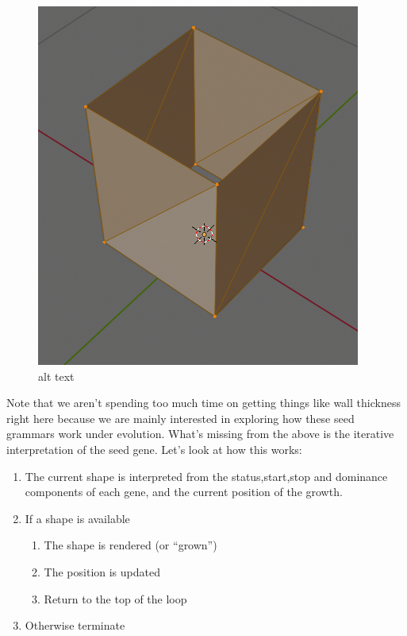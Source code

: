 \documentclass[]{article}
\providecommand{\tightlist}{%
  \setlength{\itemsep}{0pt}\setlength{\parskip}{0pt}}
\begin{document}
\begin{figure}
\centering
\includegraphics{blender_gene1.png}
\caption{alt text}
\end{figure}

Note that we aren't spending too much time on getting things like wall
thickness right here because we are mainly interested in exploring how
these seed grammars work under evolution. What's missing from the above
is the iterative interpretation of the seed gene. Let's look at how this
works:

\begin{enumerate}
\def\labelenumi{\arabic{enumi}.}
\tightlist
\item
  The current shape is interpreted from the status,start,stop and
  dominance components of each gene, and the current position of the
  growth.
\item
  If a shape is available

  \begin{enumerate}
  \def\labelenumii{\arabic{enumii}.}
  \tightlist
  \item
    The shape is rendered (or ``grown'')
  \item
    The position is updated
  \item
    Return to the top of the loop
  \end{enumerate}
\item
  Otherwise terminate
\end{enumerate}
\end{document}
